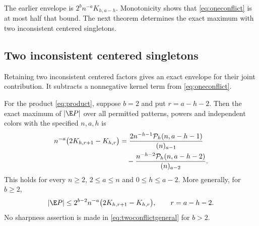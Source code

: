 The earlier envelope is $2^bn^{-a}K_{h,a-h}$. Monotonicity shows that \eqref{eq:oneconflict} is at most half that bound. The next theorem determines the exact maximum with two inconsistent centered singletons.


\subsection{Two inconsistent centered singletons}

Retaining two inconsistent centered factors gives an exact envelope for their joint contribution. It subtracts a nonnegative kernel term from \eqref{eq:oneconflict}.

\begin{theorem}\label{thm:twoconflict}
For the product \eqref{eq:product}, suppose $b=2$ and put $r=a-h-2$. Then the exact maximum of $|\E P|$ over all permitted patterns, powers and independent colors with the specified $n,a,h$ is
\begin{align}
n^{-a}\bigl(2K_{h,r+1}-K_{h,r}\bigr)
&=\frac{2n^{-h-1}\mathcal P_h(n,a-h-1)}{(n)_{a-1}}\notag\\
&\quad-\frac{n^{-h-2}\mathcal P_h(n,a-h-2)}{(n)_{a-2}}.
\label{eq:twoconflictexact}
\end{align}
This holds for every $n\ge2$, $2\le a\le n$ and $0\le h\le a-2$. More generally, for $b\ge2$,
\begin{equation}\label{eq:twoconflictgeneral}
|\E P|\le2^{b-2}n^{-a}\bigl(2K_{h,r+1}-K_{h,r}\bigr),
\qquad r=a-h-2.
\end{equation}
No sharpness assertion is made in \eqref{eq:twoconflictgeneral} for $b>2$.
\end{theorem}
